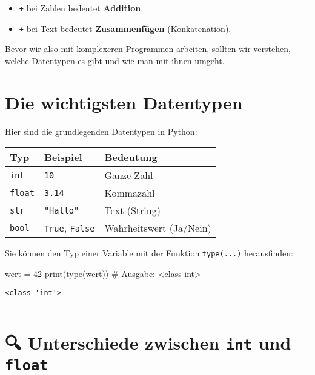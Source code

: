 \documentclass[
  letterpaper,
  DIV=11,
  numbers=noendperiod]{scrreprt}
\newenvironment{Shaded}{\begin{snugshade}}{\end{snugshade}}
\newcommand{\BuiltInTok}[1]{\textcolor[rgb]{0.00,0.23,0.31}{#1}}
\newcommand{\CommentTok}[1]{\textcolor[rgb]{0.37,0.37,0.37}{#1}}
\newcommand{\DecValTok}[1]{\textcolor[rgb]{0.68,0.00,0.00}{#1}}
\newcommand{\NormalTok}[1]{\textcolor[rgb]{0.00,0.23,0.31}{#1}}
\newcommand{\OperatorTok}[1]{\textcolor[rgb]{0.37,0.37,0.37}{#1}}
\providecommand{\tightlist}{%
  \setlength{\itemsep}{0pt}\setlength{\parskip}{0pt}}\usepackage{longtable,booktabs,array}
\begin{document}
\begin{itemize}
\tightlist
\item
  \texttt{+} bei Zahlen bedeutet \textbf{Addition},
\item
  \texttt{+} bei Text bedeutet \textbf{Zusammenfügen} (Konkatenation).
\end{itemize}

Bevor wir also mit komplexeren Programmen arbeiten, sollten wir
verstehen, welche Datentypen es gibt und wie man mit ihnen umgeht.

\section{Die wichtigsten Datentypen}\label{die-wichtigsten-datentypen}

Hier sind die grundlegenden Datentypen in Python:

\begin{longtable}[]{@{}lll@{}}
\toprule\noalign{}
Typ & Beispiel & Bedeutung \\
\midrule\noalign{}
\endhead
\bottomrule\noalign{}
\endlastfoot
\texttt{int} & \texttt{10} & Ganze Zahl \\
\texttt{float} & \texttt{3.14} & Kommazahl \\
\texttt{str} & \texttt{"Hallo"} & Text (String) \\
\texttt{bool} & \texttt{True}, \texttt{False} & Wahrheitswert
(Ja/Nein) \\
\end{longtable}

Sie können den Typ einer Variable mit der Funktion \texttt{type(...)}
herausfinden:

\begin{Shaded}
\begin{Highlighting}[]
\NormalTok{wert }\OperatorTok{=} \DecValTok{42}
\BuiltInTok{print}\NormalTok{(}\BuiltInTok{type}\NormalTok{(wert))  }\CommentTok{\# Ausgabe: \textless{}class \textquotesingle{}int\textquotesingle{}\textgreater{}}
\end{Highlighting}
\end{Shaded}

\begin{verbatim}
<class 'int'>
\end{verbatim}

\begin{center}\rule{0.5\linewidth}{0.5pt}\end{center}

\section{\texorpdfstring{🔍 Unterschiede zwischen \texttt{int} und
\texttt{float}}{🔍 Unterschiede zwischen int und float}}\label{unterschiede-zwischen-int-und-float}
\end{document}
